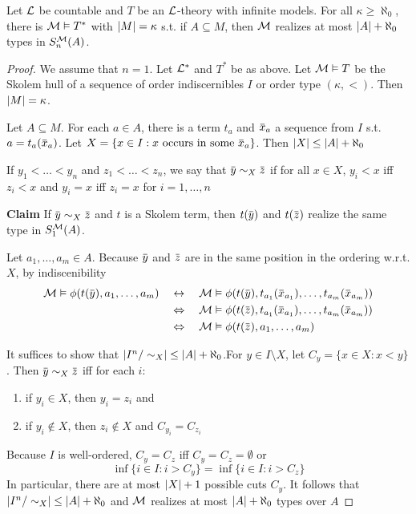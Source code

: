 \documentclass[11pt]{article}
\begin{document}
\begin{theorem}[]
\label{thm5.2.9}
Let \(\mathcal{L}\) be countable and \(T\) be an \(\mathcal{L}\)-theory with infinite models. For all \(\kappa\ge\aleph_0\),
there is \(\mathcal{M}\vDash T^*\) with \(\abs{M}=\kappa\) s.t. if \(A\subseteq M\), then \(\mathcal{M}\) realizes at
most \(\abs{A}+\aleph_0\) types in \(S_n^{\mathcal{M}}(A)\).
\end{theorem}

\begin{proof}
We assume that \(n=1\). Let \(\mathcal{L}^*\) and \(T^*\) be as above. Let \(\mathcal{M}\vDash T\) be the Skolem hull of
a sequence of order indiscernibles \(I\) or order type \((\kappa,<)\). Then \(\abs{M}=\kappa\).

Let \(A\subseteq M\). For each \(a\in A\), there is a term \(t_a\) and \(\barx_a\) a sequence from \(I\)
s.t. \(a=t_a(\barx_a)\). Let \(X=\{x\in I:x\text{ occurs in some }\barx_a\}\).
Then \(\abs{X}\le\abs{A}+\aleph_0\)

If \(y_1<\dots<y_n\) and \(z_1<\dots<z_n\), we say that \(\bary\sim_X\barz\) if for all \(x\in X\), \(y_i<x\)
iff \(z_i<x\) and \(y_i=x\) iff \(z_i=x\) for \(i=1,\dots,n\)

\textbf{Claim} If \(\bary\sim_X\barz\)  and \(t\) is a Skolem term, then \(t(\bary)\) and \(t(\barz)\)
 realize the same type in \(S_1^{\mathcal{M}}(A)\).

Let \(a_1,\dots,a_m\in A\). Because \(\bary\) and \(\barz\) are in the same position in the ordering
w.r.t. \(X\), by indiscenibility
\begin{align*}
\calm\vDash\phi(t(\bary),a_1,\dots,a_m)\quad&\leftrightarrow\quad\calm\vDash\phi(t(\bary),t_{a_1}(\barx_{a_1}),\dots,t_{a_m}(\barx_{a_m}))\\
&\Leftrightarrow\quad\calm\vDash\phi(t(\barz),t_{a_1}(\barx_{a_1}),\dots,t_{a_m}(\barx_{a_m}))\\
&\Leftrightarrow\quad\calm\vDash\phi(t(\barz),a_1,\dots,a_m)
\end{align*}

It suffices to show that \(\abs{I^n/\sim_X}\le\abs{A}+\aleph_0\).For \(y\in I\setminus X\), let \(C_y=\{x\in X:x<y\}\).
Then \(\bary\sim_X\barz\) iff for each \(i\):
\begin{enumerate}
\item if \(y_i\in X\), then \(y_i=z_i\) and
\item if \(y_i\notin X\), then \(z_i\notin X\) and \(C_{y_i}=C_{z_i}\)
\end{enumerate}


Because \(I\) is well-ordered, \(C_y=C_z\) iff \(C_y=C_z=\emptyset\) or
\begin{equation*}
\inf\{i\in I:i>C_y\}=\inf\{i\in I:i>C_z\}
\end{equation*}
In particular, there are at most \(\abs{X}+1\) possible cuts \(C_y\). It follows
that \(\abs{I^n/\sim_X}\le\abs{A}+\aleph_0\) and \(\mathcal{M}\) realizes at most \(\abs{A}+\aleph_0\) types over \(A\)
\end{proof}
\end{document}
